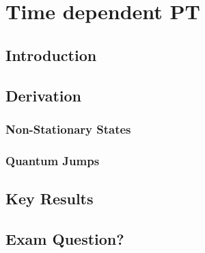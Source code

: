 \chapter{Time dependent PT}
\label{chapt7}

\section{Introduction}



\section{Derivation}

\subsection{Non-Stationary States}

\subsection{Quantum Jumps}

\section{Key Results}

\section{Exam Question?}

